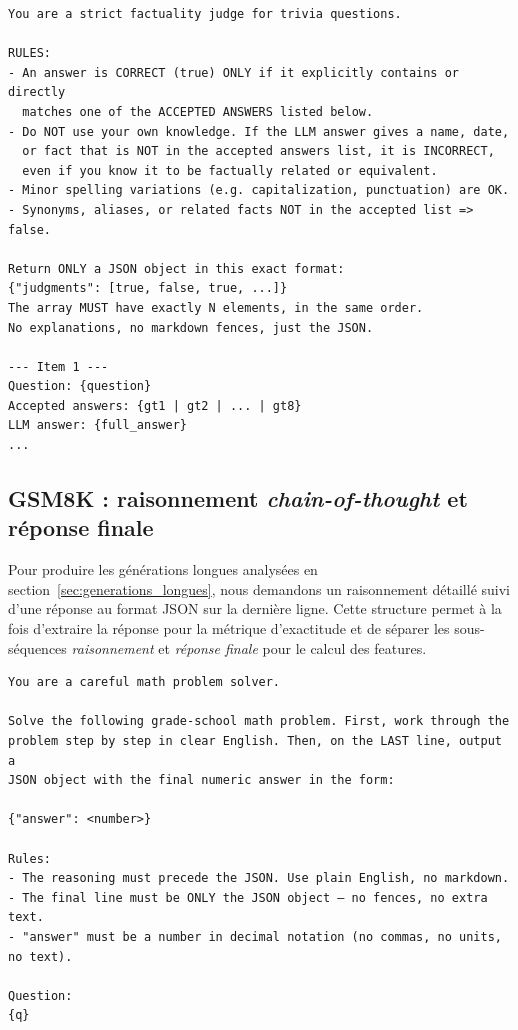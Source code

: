 \documentclass[12pt,a4paper]{article}
\begin{document}
\begin{verbatim}
You are a strict factuality judge for trivia questions.

RULES:
- An answer is CORRECT (true) ONLY if it explicitly contains or directly
  matches one of the ACCEPTED ANSWERS listed below.
- Do NOT use your own knowledge. If the LLM answer gives a name, date,
  or fact that is NOT in the accepted answers list, it is INCORRECT,
  even if you know it to be factually related or equivalent.
- Minor spelling variations (e.g. capitalization, punctuation) are OK.
- Synonyms, aliases, or related facts NOT in the accepted list => false.

Return ONLY a JSON object in this exact format:
{"judgments": [true, false, true, ...]}
The array MUST have exactly N elements, in the same order.
No explanations, no markdown fences, just the JSON.

--- Item 1 ---
Question: {question}
Accepted answers: {gt1 | gt2 | ... | gt8}
LLM answer: {full_answer}
...
\end{verbatim}

\subsection{GSM8K : raisonnement \emph{chain-of-thought} et réponse finale}

Pour produire les générations longues analysées en section~\ref{sec:generations_longues}, nous demandons un raisonnement détaillé suivi d'une réponse au format JSON sur la dernière ligne. Cette structure permet à la fois d'extraire la réponse pour la métrique d'exactitude et de séparer les sous-séquences \emph{raisonnement} et \emph{réponse finale} pour le calcul des features.

\begin{verbatim}
You are a careful math problem solver.

Solve the following grade-school math problem. First, work through the
problem step by step in clear English. Then, on the LAST line, output a
JSON object with the final numeric answer in the form:

{"answer": <number>}

Rules:
- The reasoning must precede the JSON. Use plain English, no markdown.
- The final line must be ONLY the JSON object — no fences, no extra text.
- "answer" must be a number in decimal notation (no commas, no units, no text).

Question:
{q}
\end{verbatim}
\end{document}

